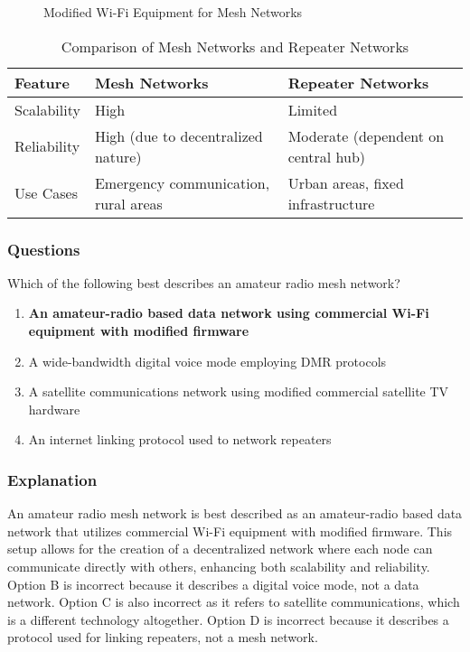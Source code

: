 \begin{figure}[h]
    \centering
    \caption{Modified Wi-Fi Equipment for Mesh Networks}
    \label{fig:mesh-wifi}
\end{figure}

\begin{table}[h]
    \centering
    \begin{tabular}{|l|l|l|}
        \hline
        \textbf{Feature} & \textbf{Mesh Networks} & \textbf{Repeater Networks} \\
        \hline
        Scalability & High & Limited \\
        Reliability & High (due to decentralized nature) & Moderate (dependent on central hub) \\
        Use Cases & Emergency communication, rural areas & Urban areas, fixed infrastructure \\
        \hline
    \end{tabular}
    \caption{Comparison of Mesh Networks and Repeater Networks}
    \label{tab:mesh-repeater-comparison}
\end{table}

\subsubsection*{Questions}

\begin{tcolorbox}[colback=gray!10!white,colframe=black!75!black,title={T8D12}]
    Which of the following best describes an amateur radio mesh network?
    \begin{enumerate}[label=\Alph*),noitemsep]
        \item \textbf{An amateur-radio based data network using commercial Wi-Fi equipment with modified firmware}
        \item A wide-bandwidth digital voice mode employing DMR protocols
        \item A satellite communications network using modified commercial satellite TV hardware
        \item An internet linking protocol used to network repeaters
    \end{enumerate}
\end{tcolorbox}

\subsubsection*{Explanation}

An amateur radio mesh network is best described as an amateur-radio based data network that utilizes commercial Wi-Fi equipment with modified firmware. This setup allows for the creation of a decentralized network where each node can communicate directly with others, enhancing both scalability and reliability. Option B is incorrect because it describes a digital voice mode, not a data network. Option C is also incorrect as it refers to satellite communications, which is a different technology altogether. Option D is incorrect because it describes a protocol used for linking repeaters, not a mesh network.

